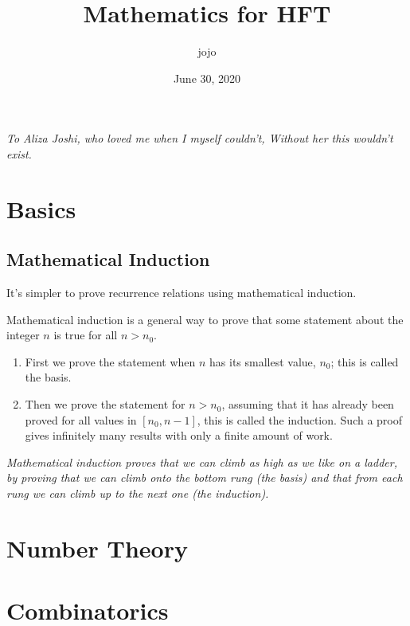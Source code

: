 \documentclass[letterpaper,12pt]{report}
\theoremstyle{definition}
\theoremstyle{remark}
\begin{document}
\title{Mathematics for HFT}
\author{jojo}
\date{June 30, 2020}
\maketitle

\newpage
\vspace*{8cm}
\begin{center}
	\large \emph{
		To Aliza Joshi,\linebreak 
		who loved me when I myself couldn't,\linebreak
		Without her this wouldn't exist.}
\end{center}

\tableofcontents

\part{Basics}
\chapter {Mathematical Induction}
It's simpler to prove recurrence relations using mathematical induction.

Mathematical induction is a general way to prove that some statement about the integer $n$ is true for all $n > n_0$. 
\begin{enumerate}
    \item First we prove the statement when $n$ has its smallest value, $n_0$; this is called the basis.
    \item Then we prove the statement for $n > n_0$, assuming that it has already been proved for all values in $ [n_0, n - 1]$, this is called the induction. Such a proof gives infinitely many results with only a finite amount of work. 
\end{enumerate}

\textit{Mathematical induction proves that we can climb as high as we like on a ladder, by proving that we can climb onto the bottom rung (the basis) and that from each rung we can climb up to the next one (the induction).}



\part {Number Theory}
\part {Combinatorics}
\end{document}
